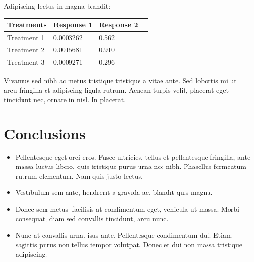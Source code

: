 \documentclass[a0,portrait, 30pt]{a0poster}
\begin{document}
\begin{minipage}{0.49\linewidth}
Adipiscing lectus in magna blandit:

\begin{center}\vspace{1cm}
\begin{tabular}{l l l l}
\toprule
\textbf{Treatments} & \textbf{Response 1} & \textbf{Response 2} \\
\midrule
Treatment 1 & 0.0003262 & 0.562 \\
Treatment 2 & 0.0015681 & 0.910 \\
Treatment 3 & 0.0009271 & 0.296 \\
\bottomrule
\end{tabular}
\end{center}\vspace{1cm}

Vivamus sed nibh ac metus tristique tristique a vitae ante. Sed lobortis mi ut arcu fringilla et adipiscing ligula rutrum. Aenean turpis velit, placerat eget tincidunt nec, ornare in nisl. In placerat.

\begin{center}\vspace{1cm}
\end{center}\vspace{1cm}


\color{SaddleBrown} %

\section*{Conclusions}

\begin{itemize}
\item Pellentesque eget orci eros. Fusce ultricies, tellus et pellentesque fringilla, ante massa luctus libero, quis tristique purus urna nec nibh. Phasellus fermentum rutrum elementum. Nam quis justo lectus.
\item Vestibulum sem ante, hendrerit a gravida ac, blandit quis magna.
\item Donec sem metus, facilisis at condimentum eget, vehicula ut massa. Morbi consequat, diam sed convallis tincidunt, arcu nunc.
\item Nunc at convallis urna. isus ante. Pellentesque condimentum dui. Etiam sagittis purus non tellus tempor volutpat. Donec et dui non massa tristique adipiscing.
\end{itemize}


\end{minipage}
\end{document}
